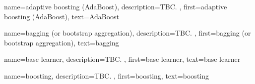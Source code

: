 \newcommand{\gaussiancenter}{3}

{name={adaptive boosting (AdaBoost)},
	description={TBC. }, 
	first={adaptive boosting (AdaBoost)}, 
	text={AdaBoost}
}

{name={bagging (or bootstrap aggregation)},
	description={TBC. },
	first={bagging (or bootstrap aggregation)},
	text={bagging}  
}

{name={base learner}, 
	description={TBC. },
	first={base learner},
	text={base learner}
}

{name={boosting}, 
	description={TBC. }, 
	first={boosting}, 
	text={boosting}
}

